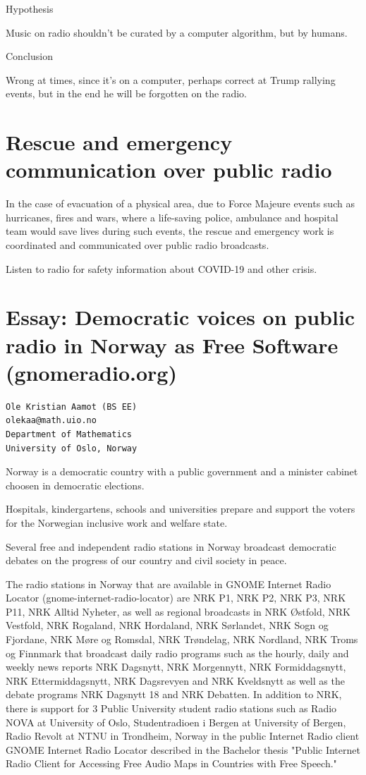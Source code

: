 \documentclass[a4paper,norsk,utf8]{report}
\begin{document}
Hypothesis

Music on radio shouldn't be curated by a computer algorithm, but by humans.

Conclusion

Wrong at times, since it's on a computer, perhaps correct at Trump
rallying events, but in the end he will be forgotten on the radio.

\part{Rescue and emergency communication over public radio}

In the case of evacuation of a physical area, due to Force
Majeure events such as hurricanes, fires and wars, where a
life-saving police, ambulance and hospital team would save
lives during such events, the rescue and emergency work is
coordinated and communicated over public radio broadcasts.

Listen to radio for safety information about COVID-19 and other crisis.

\part{Essay: Democratic voices on public radio in Norway as Free Software (gnomeradio.org)}

\begin{verbatim}
Ole Kristian Aamot (BS EE)
olekaa@math.uio.no
Department of Mathematics
University of Oslo, Norway
\end{verbatim}

Norway is a democratic country with a public government and a minister cabinet choosen in democratic elections.

Hospitals, kindergartens, schools and universities prepare and support 
the voters for the Norwegian inclusive work and welfare state.

Several free and independent radio stations in Norway broadcast democratic 
debates on the progress of our country and civil society in peace.

The radio stations in Norway that are available in GNOME Internet Radio Locator (gnome-internet-radio-locator) are NRK P1, NRK P2, NRK P3, NRK P11, NRK Alltid Nyheter, as well as regional broadcasts in NRK Østfold, NRK Vestfold, NRK Rogaland, NRK Hordaland, NRK Sørlandet, NRK Sogn og Fjordane, NRK Møre og Romsdal, NRK Trøndelag, NRK Nordland, NRK Troms og Finnmark that broadcast daily radio programs such as the hourly, daily and weekly news reports NRK Dagsnytt, NRK Morgennytt, NRK Formiddagsnytt, NRK Ettermiddagsnytt, NRK Dagsrevyen and NRK Kveldsnytt as well as the debate programs NRK Dagsnytt 18 and NRK Debatten.  In addition to NRK, there is support for 3 Public University student radio stations such as Radio NOVA at University of Oslo, Studentradioen i Bergen at University of Bergen, Radio Revolt at NTNU in Trondheim, Norway in the public Internet Radio client GNOME Internet Radio Locator described in the Bachelor thesis "Public Internet Radio Client for Accessing Free Audio Maps in Countries with Free Speech."
\end{document}
